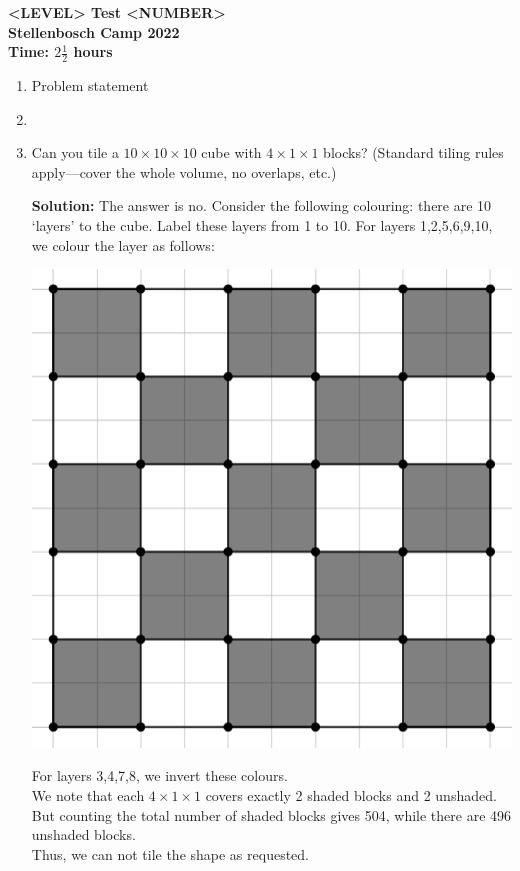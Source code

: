 \documentclass{article}
\begin{document}
\thispagestyle{empty}

\begin{center}
  \textbf{\Large <LEVEL> Test <NUMBER>}
  \\ \vspace{1em}
  \textbf{\large Stellenbosch Camp 2022}
  \\ \vspace{1em}
  \textbf{\large Time: $2\frac{1}{2}$ hours}
\end{center}

\bigskip

\begin{enumerate}[itemsep=\fill]

\item %
Problem statement


\item %


\item %
Can you tile a $10\times 10\times 10$ cube with $4\times 1\times 1$ blocks? (Standard tiling rules apply---cover the whole volume, no overlaps, etc.)

\textbf{Solution:} The answer is no. Consider the following colouring: there are 10 `layers' to the cube. Label these layers from 1 to 10. For layers 1,2,5,6,9,10, we colour the layer as follows:
\begin{center}
\includegraphics[scale=0.5]{Capture.png}
\end{center}
For layers 3,4,7,8, we invert these colours.\\
We note that each $4\times 1\times 1$ covers exactly 2 shaded blocks and 2 unshaded.\\
But counting the total number of shaded blocks gives 504, while there are 496 unshaded blocks.\\
Thus, we can not tile the shape as requested. 



\end{enumerate}
\end{document}
